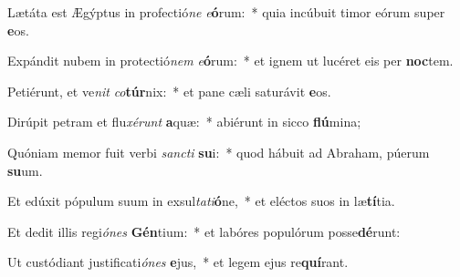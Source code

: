 \item Lætáta est Ægýptus in profectió\textit{ne} \textit{e}\textbf{ó}rum:~* quia incúbuit timor eórum super \textbf{e}os.
\item Expándit nubem in protectió\textit{nem} \textit{e}\textbf{ó}rum:~* et ignem ut lucéret eis per \textbf{noc}tem.
\item Petiérunt, et ve\textit{nit} \textit{co}\textbf{túr}nix:~* et pane cæli saturávit \textbf{e}os.
\item Dirúpit petram et flu\textit{xé}\textit{runt} \textbf{a}quæ:~* abiérunt in sicco \textbf{flú}mina;
\item Quóniam memor fuit verbi \textit{sanc}\textit{ti} \textbf{su}i:~* quod hábuit ad Abraham, púerum \textbf{su}um.
\item Et edúxit pópulum suum in exsul\textit{ta}\textit{ti}\textbf{ó}ne,~* et eléctos suos in læ\textbf{tí}tia.
\item Et dedit illis regi\textit{ó}\textit{nes} \textbf{Gén}tium:~* et labóres populórum posse\textbf{dé}runt:
\item Ut custódiant justificati\textit{ó}\textit{nes} \textbf{e}jus,~* et legem ejus re\textbf{quí}rant.
